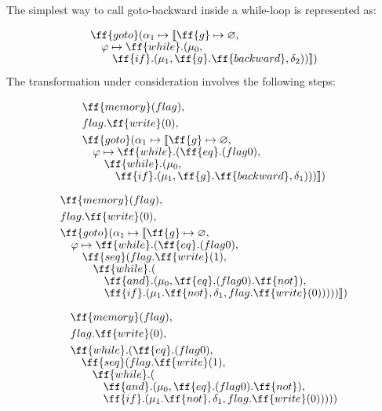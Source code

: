 \documentclass[sigplan,review,11pt,nonacm,natbib=false]{acmart}
\newcommand\br{\\[-4pt]}
\begin{document}
The simplest way to call goto-backward inside a while-loop is represented as:

\begin{equation}
\begin{split}
& \ff{goto}(\alpha_1 \mapsto \llbracket \ff{g} \mapsto \varnothing, \br
& \quad \varphi \mapsto \ff{while}.(\mu_0, \br
& \quad \quad \ff{if}.(\mu_1, \ff{g}.\ff{backward}, \delta_2))\rrbracket) \br
\end{split}
\end{equation}

The transformation under consideration involves the following steps:

\begin{equation}
\begin{split}
& \ff{memory}(flag), \\
& flag.\ff{write}(0), \\
& \ff{goto}(\alpha_1 \mapsto \llbracket \ff{g} \mapsto \varnothing, \br
& \quad \varphi \mapsto \ff{while}.(\ff{eq}.(flag 0), \br
& \quad \quad \ff{while}.(\mu_0, \br
& \quad \quad \quad \ff{if}.( \mu_1, \ff{g}.\ff{backward}, \delta_1 )))\rrbracket) \\[-1pt]
\end{split}
\end{equation}

\begin{equation}
\begin{split}
& \ff{memory}(flag), \\
& flag.\ff{write}(0), \\
& \ff{goto}(\alpha_1 \mapsto \llbracket \ff{g} \mapsto \varnothing, \br
& \quad \varphi \mapsto \ff{while}.(\ff{eq}.(flag 0), \br
& \quad \quad \ff{seq}(flag.\ff{write}(1), \br
& \quad \quad \quad \ff{while}.( \br
& \quad \quad \quad \quad \ff{and}.(\mu_0, \ff{eq}.(flag 0).\ff{not}), \br
& \quad \quad \quad \quad \ff{if}.( \mu_1.\ff{not}, \delta_1, flag.\ff{write}(0) ))))\rrbracket) \\[-1pt]
\end{split}
\end{equation}

\begin{equation}
\begin{split}
& \ff{memory}(flag), \\
& flag.\ff{write}(0), \\
& \ff{while}.(\ff{eq}.(flag 0), \br
& \quad \ff{seq}(flag.\ff{write}(1), \br
& \quad \quad \ff{while}.( \br
& \quad \quad \quad \ff{and}.(\mu_0, \ff{eq}.(flag 0).\ff{not}), \br
& \quad \quad \quad \ff{if}.( \mu_1.\ff{not}, \delta_1, flag.\ff{write}(0) )))) \\[-1pt]
\end{split}
\end{equation}
\end{document}
